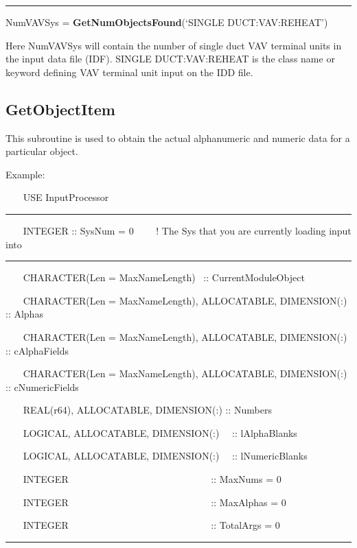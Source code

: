 \begin{center}\rule{0.5\linewidth}{0.4pt}\end{center}

NumVAVSys = \textbf{GetNumObjectsFound}(`SINGLE DUCT:VAV:REHEAT')

Here NumVAVSys will contain the number of single duct VAV terminal units in the input data file (IDF). SINGLE DUCT:VAV:REHEAT is the class name or keyword defining VAV terminal unit input on the IDD file.

\subsection{GetObjectItem}\label{getobjectitem}

This subroutine is used to obtain the actual alphanumeric and numeric data for a particular object.

Example:

~~~ USE InputProcessor

\begin{center}\rule{0.5\linewidth}{0.4pt}\end{center}

~~~ INTEGER :: SysNum = 0~~~~ ! The Sys that you are currently loading input into

\begin{center}\rule{0.5\linewidth}{0.4pt}\end{center}

~~~ CHARACTER(Len = MaxNameLength)~ :: CurrentModuleObject

~~~ CHARACTER(Len = MaxNameLength), ALLOCATABLE, DIMENSION(:) :: Alphas

~~~ CHARACTER(Len = MaxNameLength), ALLOCATABLE, DIMENSION(:) :: cAlphaFields

~~~ CHARACTER(Len = MaxNameLength), ALLOCATABLE, DIMENSION(:) :: cNumericFields

~~~ REAL(r64), ALLOCATABLE, DIMENSION(:) :: Numbers

~~~ LOGICAL, ALLOCATABLE, DIMENSION(:)~~ :: lAlphaBlanks

~~~ LOGICAL, ALLOCATABLE, DIMENSION(:)~~ :: lNumericBlanks

~~~ INTEGER~~~~~~~~~~~~~~~~~~~~~~~~~~~~~ :: MaxNums = 0

~~~ INTEGER~~~~~~~~~~~~~~~~~~~~~~~~~~~~~ :: MaxAlphas = 0

~~~ INTEGER~~~~~~~~~~~~~~~~~~~~~~~~~~~~~ :: TotalArgs = 0

\begin{center}\rule{0.5\linewidth}{0.4pt}\end{center}

